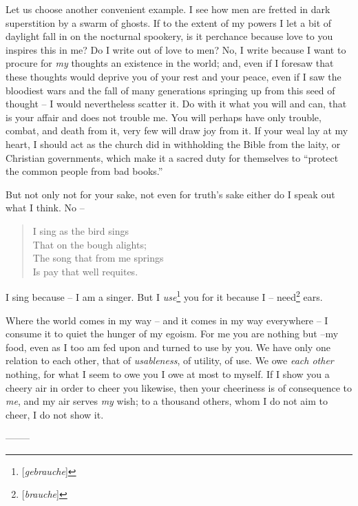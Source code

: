Let us choose another convenient example. I see how men are fretted in dark 
superstition by a swarm of ghosts. If to the extent of my powers I let a bit 
of daylight fall in on the nocturnal spookery, is it perchance because love to 
you inspires this in me? Do I write out of love to men? No, I write because I 
want to procure for \textit{my} thoughts an existence in the world; and, even 
if I foresaw that these thoughts would deprive you of your rest and your 
peace, even if I saw the bloodiest wars and the fall of many generations 
springing up from this seed of thought -- I would nevertheless scatter it. Do 
with it what you will and can, that is your affair and does not trouble me. 
You will perhaps have only trouble, combat, and death from it, very few will 
draw joy from it. If your weal lay at my heart, I should act as the church did 
in withholding the Bible from the laity, or Christian governments, which make 
it a sacred duty for themselves to ``protect the common people from bad 
books.''

But not only not for your sake, not even for truth's sake either do I speak 
out what I think. No --

\begin{quotation}

\noindent{}I sing as the bird sings\\
 That on the bough alights;\\
 The song that from me springs\\
 Is pay that well requites.\end{quotation}

\noindent{}I sing because -- I am a singer. But I 
\textit{use}\footnote{[\textit{gebrauche}]} you for it because I -- 
need\footnote{[\textit{brauche}]} ears.

Where the world comes in my way -- and it comes in my way everywhere -- I 
consume it to quiet the hunger of my egoism. For me you are nothing but --my 
food, even as I too am fed upon and turned to use by you. We have only one 
relation to each other, that of \textit{usableness}, of utility, of use. We 
owe \textit{each other} nothing, for what I seem to owe you I owe at most to 
myself. If I show you a cheery air in order to cheer you likewise, then your 
cheeriness is of consequence to \textit{me}, and my air serves \textit{my} 
wish; to a thousand others, whom I do not aim to cheer, I do not show it.

\begin{center}
--------\end{center}


